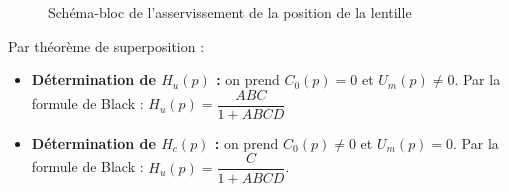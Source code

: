 \begin{figure}[!htb]
\begin{center}
\begin{large}
\end{large}
\caption{Schéma-bloc de l'asservissement de la position de la lentille \label{fig14}}
\end{center}
\end{figure}


\ifprof
\begin{corrige}
Par théorème de superposition : 
\begin{itemize}
\item \textbf{Détermination de $H_u(p)$ : } on prend $C_0(p)=0$ et $U_m(p)\neq 0$.
Par la formule de Black : 
$ H_u(p)=\dfrac{ABC}{1+ABCD}$
\item \textbf{Détermination de $H_c(p)$ : } on prend $C_0(p)\neq 0$ et $U_m(p)= 0$.
Par la formule de Black : $H_u(p)=\dfrac{C}{1+ABCD}$.
\end{itemize}
\end{corrige}
\else
\fi

